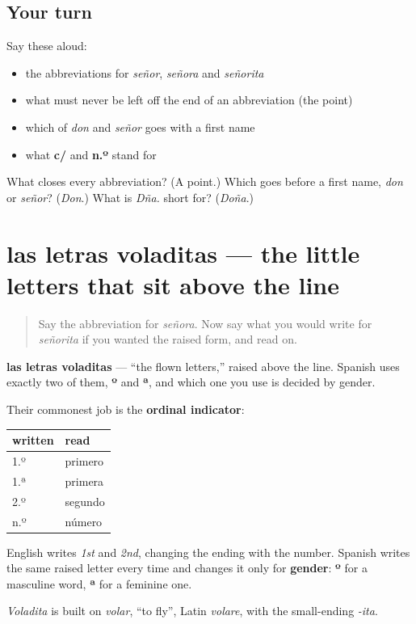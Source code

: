 \subsection*{Your turn}
Say these aloud:

\begin{itemize}
\raggedright
  \item the abbreviations for \emph{señor}, \emph{señora} and \emph{señorita}
  \item what must never be left off the end of an abbreviation (the point)
  \item which of \emph{don} and \emph{señor} goes with a first name
  \item what \textbf{c/} and \textbf{n.º} stand for
\end{itemize}

\begin{tcolorbox}[breakable,colback=teal!4,colframe=teal!35!black,title={Before you move on}]
What closes every abbreviation? (A point.) Which goes before a first name, \emph{don} or \emph{señor}? (\emph{Don}.) What is \emph{Dña.} short for? (\emph{Doña}.)
\end{tcolorbox}
\section[las letras voladitas]{las letras voladitas — the little letters that sit above the line}

\label{lesson:ES-C426-voladitas}



\begin{quote}
Say the abbreviation for \emph{señora}. Now say what you would write for \emph{señorita} if you wanted the raised form, and read on.
\end{quote}

\begin{cousinweb}
\textbf{las letras voladitas} — \textquotedblleft{}the flown letters,\textquotedblright{} raised above the line. Spanish uses exactly two of them, \textbf{º} and \textbf{ª}, and which one you use is decided by gender.

Their commonest job is the \textbf{ordinal indicator}:

\noindent
\begin{tabularx}{\linewidth}{@{}>{\raggedright\arraybackslash}X>{\raggedright\arraybackslash}X@{}}
\toprule
\textbf{written} & \textbf{read} \\
\midrule
1.º & primero \\
1.ª & primera \\
2.º & segundo \\
n.º & número \\
\bottomrule
\end{tabularx}

English writes \emph{1st} and \emph{2nd}, changing the ending with the number. Spanish writes the same raised letter every time and changes it only for \textbf{gender}: \textbf{º} for a masculine word, \textbf{ª} for a feminine one.

\emph{Voladita} is built on \emph{volar}, \textquotedblleft{}to fly\textquotedblright{}, Latin \emph{volare}, with the small-ending \emph{-ita}.
\end{cousinweb}

